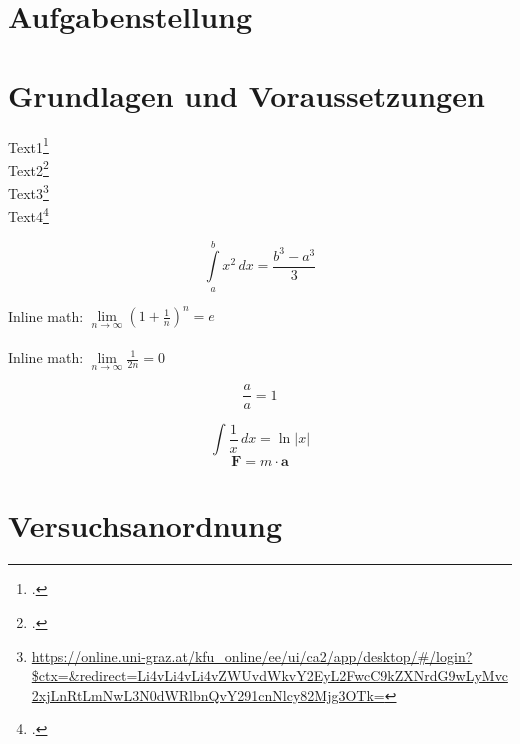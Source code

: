 \documentclass[11pt, DIV=calc, ngerman]{scrartcl}
\begin{document}


\clearpage
\tableofcontents
\newpage

\section{Aufgabenstellung}
\label{sec:aufgabenstellung}



\section{Grundlagen und Voraussetzungen}
\label{sec:grundlagen_voraussetzungen}

Text1\footcite[1000]{ref:dem1} \\
Text2\footcite[Kapitel 74]{ref:knoll} \\
Text3\footnote{\url{https://online.uni-graz.at/kfu_online/ee/ui/ca2/app/desktop/\#/login?$ctx=&redirect=Li4vLi4vLi4vZWUvdWkvY2EyL2FwcC9kZXNrdG9wLyMvc2xjLnRtLmNwL3N0dWRlbnQvY291cnNlcy82Mjg3OTk=}} \\  %
Text4\footcite{ref:genol2013}

\begin{equation}
\label{eq:grenzen-oben-unten}
    \int \limits_{a}^{b} x^2 \, dx =\frac{b^3-a^3}{3}  %
\end{equation}

Inline math: \(\lim \limits_{n \to \infty} \left( 1 + \frac{1}{n} \right) ^{n} = e\)  \\ \\ %
Inline math: $\lim \limits_{n \to \infty} \frac{1}{2n} = 0$  %

\begin{displaymath}
    \frac{a}{a} = 1
\end{displaymath}

\[ \int \frac{1}{x} \, dx = \ln|x| \]  %
$$ \textbf{F} = m \cdot \textbf{a} $$  %



\section{Versuchsanordnung}
\label{sec:versuchsanordnung}
\end{document}
